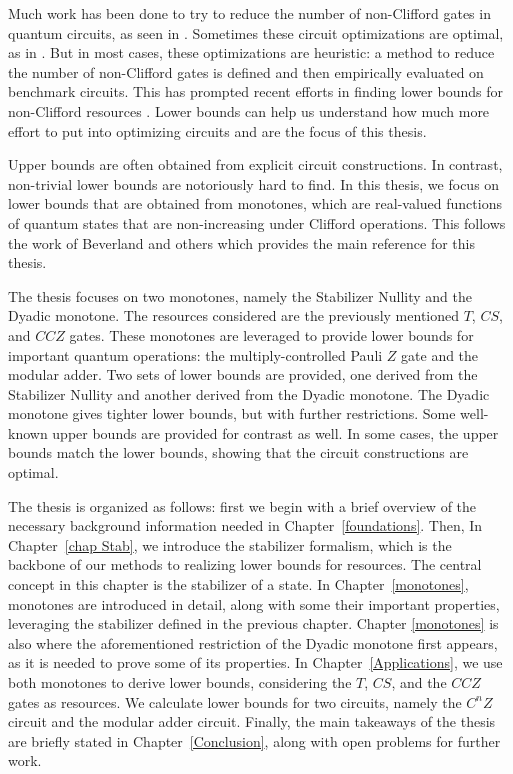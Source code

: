 \documentclass[12pt]{dalthesis}
\begin{document}
Much work has been done to try to reduce the number of non-Clifford gates in quantum circuits, as seen in \cite{ross2016optimal, selinger2014efficient, Amy_2019, glaudell2021optimal, haner2018optimizing, amy2021phasestate, gosset2013algorithm}. Sometimes these circuit optimizations are optimal, as in \cite{ross2016optimal, glaudell2021optimal, gosset2013algorithm}. But in most cases, these optimizations are heuristic: a method to reduce the number of non-Clifford gates is defined and then empirically evaluated on benchmark circuits. This has prompted recent efforts in finding lower bounds for non-Clifford resources \cite{beverland2019lower, Wang_2019, meuli2019role}. Lower bounds can help us understand how much more effort to put into optimizing circuits and are the focus of this thesis. 

Upper bounds are often obtained from explicit circuit constructions. In contrast, non-trivial lower bounds are notoriously hard to find. In this thesis, we focus on lower bounds that are obtained from monotones, which are real-valued functions of quantum states that are non-increasing under Clifford operations. This follows the work of Beverland and others \cite{beverland2019lower} which provides the main reference for this thesis. 

The thesis focuses on two monotones, namely the Stabilizer Nullity and the Dyadic monotone. The resources considered are the previously mentioned $T$, $CS$, and $CCZ$ gates. These monotones are leveraged to provide lower bounds for important quantum operations: the multiply-controlled Pauli $Z$ gate and the modular adder. Two sets of lower bounds are provided, one derived from the Stabilizer Nullity and another derived from the Dyadic monotone. The Dyadic monotone gives tighter lower bounds, but with further restrictions. Some well-known upper bounds are provided for contrast as well. In some cases, the upper bounds match the lower bounds, showing that the circuit constructions are optimal. 

The thesis is organized as follows: first we begin with a brief overview of the necessary background information needed in Chapter~\ref{foundations}. Then, In Chapter~\ref{chap Stab}, we introduce the stabilizer formalism, which is the backbone of our methods to realizing lower bounds for resources. The central concept in this chapter is the stabilizer of a state. In Chapter~\ref{monotones}, monotones are introduced in detail, along with some their important properties, leveraging the stabilizer defined in the previous chapter. Chapter \ref{monotones} is also where the aforementioned restriction of the Dyadic monotone first appears, as it is needed to prove some of its properties. In Chapter~\ref{Applications}, we use both monotones to derive lower bounds, considering the $T$, $CS$, and the $CCZ$ gates as resources. We calculate lower bounds for two circuits, namely the $C^nZ$ circuit and the modular adder circuit. Finally, the main takeaways of the thesis are briefly stated in Chapter~\ref{Conclusion}, along with open problems for further work.
\end{document}
